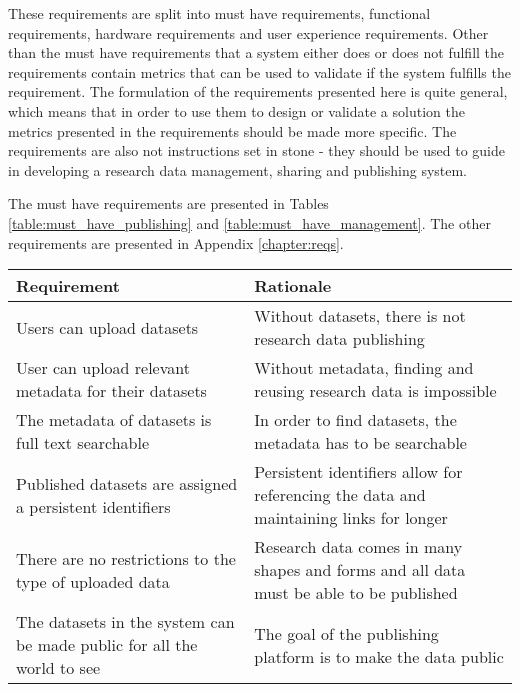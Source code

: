These requirements are split into
must have requirements, functional requirements, hardware requirements and
user experience requirements. Other than the must have requirements that a
system either does or does not fulfill the requirements contain metrics that
can be used to validate if the system fulfills the requirement. The formulation
of the requirements presented here is quite general,
which means that in order to use them to design or validate a solution the metrics
presented in the requirements should be made more specific. The requirements
are also not instructions set in stone - they should be used to guide in
developing a research data management, sharing and publishing system.

The must have requirements are presented in Tables \ref{table:must_have_publishing} and
\ref{table:must_have_management}. The other requirements are presented in Appendix
\ref{chapter:reqs}.

\addtocounter{table}{-1}
\label{table:must_have_publishing}
    \begin{tabularx}{\textwidth}{| >{\raggedright}p{3cm} | X |}
    \hline
    \textbf{Requirement} & \textbf{Rationale} \\
    \hline
    \rowcolor{Gray}
    Users can upload datasets    & Without datasets, there is not research data publishing\\
    \hline
    User can upload relevant metadata for their datasets & Without metadata, finding and reusing research data is impossible\\
    \hline
    \rowcolor{Gray}
    The metadata of datasets is full text searchable    &  In order to find datasets, the metadata has to be searchable\\
    \hline
    Published datasets are assigned a persistent identifiers    & Persistent identifiers allow for referencing the data and maintaining links for longer\\
    \hline
    \rowcolor{Gray}
    There are no restrictions to the type of uploaded data          & Research data comes in many shapes and forms and all data must be able to be published\\
    \hline
    The datasets in the system can be made public for all the world to see    & The goal of the publishing platform is to make the data public\\
    \hline
\end{tabularx}

